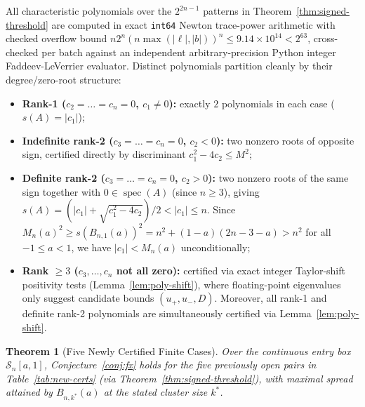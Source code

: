 \documentclass[11pt,reqno]{article}
\newtheorem{theorem}{Theorem}[section]
\theoremstyle{definition}
\begin{document}
All characteristic polynomials over the $2^{2n-1}$ patterns in Theorem~\ref{thm:signed-threshold} are computed in exact \texttt{int64} Newton trace-power arithmetic with checked overflow bound $n 2^n (n \max(|\ell|, |b|))^n \le 9.14 \times 10^{14} < 2^{63}$, cross-checked per batch against an independent arbitrary-precision Python integer Faddeev-LeVerrier evaluator. Distinct polynomials partition cleanly by their degree/zero-root structure:
\begin{itemize}
    \item \textbf{Rank-1 ($c_2 = \dots = c_n = 0$, $c_1 \ne 0$):} exactly $2$ polynomials in each case ($s(A) = |c_1|$);
    \item \textbf{Indefinite rank-2 ($c_3 = \dots = c_n = 0$, $c_2 < 0$):} two nonzero roots of opposite sign, certified directly by discriminant $c_1^2 - 4c_2 \le M^2$;
    \item \textbf{Definite rank-2 ($c_3 = \dots = c_n = 0$, $c_2 > 0$):} two nonzero roots of the same sign together with $0 \in \operatorname{spec}(A)$ (since $n \ge 3$), giving $s(A) = (|c_1| + \sqrt{c_1^2 - 4c_2})/2 < |c_1| \le n$. Since $M_n(a)^2 \ge s(B_{n, 1}(a))^2 = n^2 + (1-a)(2n - 3 - a) > n^2$ for all $-1 \le a < 1$, we have $|c_1| < M_n(a)$ unconditionally;
    \item \textbf{Rank $\ge 3$ ($c_3, \dots, c_n$ not all zero):} certified via exact integer Taylor-shift positivity tests (Lemma~\ref{lem:poly-shift}), where floating-point eigenvalues only suggest candidate bounds $(u_+, u_-, D)$. Moreover, all rank-1 and definite rank-2 polynomials are simultaneously certified via Lemma~\ref{lem:poly-shift}.
\end{itemize}

\begin{theorem}[Five Newly Certified Finite Cases]\label{thm:new-finite}
Over the continuous entry box $\mathcal{S}_n[a, 1]$, Conjecture~\ref{conj:fx} holds for the five previously open pairs in Table~\ref{tab:new-certs} (via Theorem~\ref{thm:signed-threshold}), with maximal spread attained by $B_{n, k^*}(a)$ at the stated cluster size $k^*$.
\end{theorem}
\end{document}
